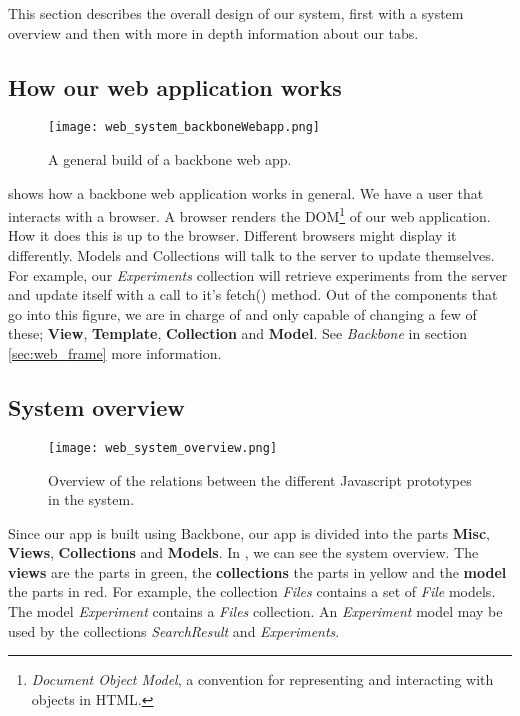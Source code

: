 This section describes the overall design of our system, first with a system overview and then with more in depth information about our tabs.
\subsection{How our web application works}
\begin{figure}[h]
\centering
\texttt{[image: web\_system\_backboneWebapp.png]}
\caption{\label{fig:web_system_backboneWebapp}A general build of a backbone web app.}
\end{figure}

 shows how a backbone\cite{web_1} web application works in general. We have a user that interacts with a browser. A browser renders the DOM\footnote{\textit{Document Object Model}, a convention for representing and interacting with objects in HTML.} of our web application. How it does this is up to the browser. Different browsers might display it differently. Models and Collections will talk to the server to update themselves. For example, our \textit{Experiments} collection will retrieve experiments from the server and update itself with a call to it’s fetch() method. Out of the components that go into this figure, we are in charge of and only capable of changing a few of these; \textbf{View}, \textbf{Template}, \textbf{Collection} and \textbf{Model}. See \textit{Backbone} in section \ref{sec:web_frame} more information.

\subsection{System overview}
\begin{figure}[h]
\centering
\texttt{[image: web\_system\_overview.png]}
\caption{\label{fig:web_system_overview}Overview of the relations between the different Javascript prototypes in the system.}
\end{figure}

Since our app is built using Backbone\cite{web_1}, our app is divided into the parts \textbf{Misc}, \textbf{Views}, \textbf{Collections} and \textbf{Models}. In , we can see the system overview. The \textbf{views} are the parts in green, the \textbf{collections} the parts in yellow and the \textbf{model} the parts in red. For example, the collection \textit{Files} contains a set of \textit{File} models. The model \textit{Experiment} contains a \textit{Files} collection. An \textit{Experiment} model may be used by the collections \textit{SearchResult} and \textit{Experiments}.

